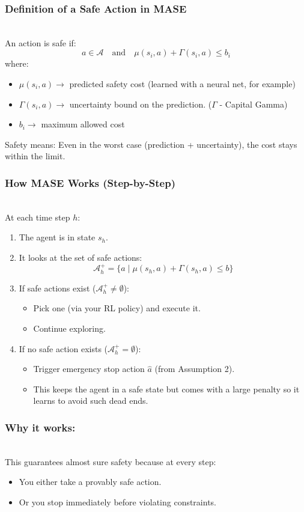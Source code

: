 \documentclass[12pt]{article}
\begin{document}
\subsubsection*{Definition of a Safe Action in MASE} \\ 
An action is safe if:
\[ a \in \mathcal{A} \quad \text{and} \quad \mu(s_i, a) + \Gamma(s_i, a) \le b_i \]
where:
\begin{itemize}
    \item $\mu(s_i, a) \to$ predicted safety cost (learned with a neural net, for example)
    \item $\Gamma(s_i, a) \to$ uncertainty bound on the prediction. ($\Gamma$ - Capital Gamma)
    \item $b_i \to$ maximum allowed cost
\end{itemize}
Safety means: Even in the worst case (prediction + uncertainty), the cost stays within the limit.

\subsubsection*{How MASE Works (Step-by-Step)}  \\ 
At each time step $h$:
\begin{enumerate}
    \item The agent is in state $s_h$.
    \item It looks at the set of safe actions:
    \[ \mathcal{A}^+_h = \{ a \mid \mu(s_h, a) + \Gamma(s_h, a) \le b \} \]
    \item If safe actions exist ($\mathcal{A}^+_h \neq \emptyset$):
    \begin{itemize}
        \item Pick one (via your RL policy) and execute it.
        \item Continue exploring.
    \end{itemize}
    \item If no safe action exists ($\mathcal{A}^+_h = \emptyset$):
    \begin{itemize}
        \item Trigger emergency stop action $\hat{a}$ (from Assumption 2).
        \item This keeps the agent in a safe state but comes with a large penalty so it learns to avoid such dead ends.
    \end{itemize}
\end{enumerate}

\subsubsection*{Why it works:}  \\ 
This guarantees almost sure safety because at every step:
\begin{itemize}
    \item You either take a provably safe action.
    \item Or you stop immediately before violating constraints.
\end{itemize}
\end{document}

